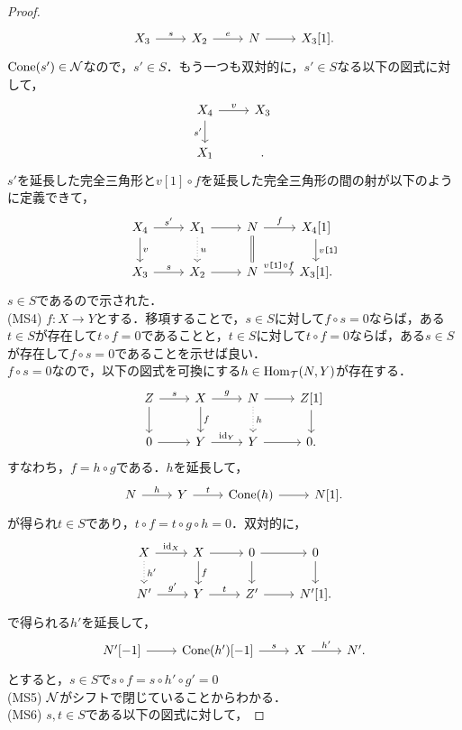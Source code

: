 \begin{proof}
\[\begin{tikzcd}
			X_3 \ar[r,"s",]& X_2\ar[r,"e",]& N \ar[r,"",]& X_3[1].
		\end{tikzcd}
	\]
$\operatorname{\mathrm{Cone}}(s')\in{\mathcal N}$なので，$s'\in S$．もう一つも双対的に，$s'\in S$なる以下の図式に対して，
  \[
  \begin{tikzcd}
		X_4\ar[r,"v"]\ar[d,"s'",swap]& X_3\\
  X_1  & .
  \end{tikzcd}
  \]
	$s'$を延長した完全三角形と$v[1]\circ f$を延長した完全三角形の間の射が以下のように定義できて，
			\[
		\begin{tikzcd}
			X_4 \ar[r,"s'",]\ar[d,"v"]& X_1\ar[r,"",]\ar[d,dotted,"u"]& N\ar[d,equal]\ar[r,"f"]& X_4[1]\ar[d,"v\texttt{[1]}"]\\
			X_3 \ar[r,"s",]& X_2\ar[r,]& N \ar[r,"v\texttt{[1]}\circ f",]& X_3[1].
		\end{tikzcd}
	\]
	$s\in S$であるので示された．\\
	(MS4) $f\colon X\to Y$とする．移項することで，$s\in S$に対して$f\circ s =0$ならば，ある$t\in S$が存在して$t\circ f = 0$であることと，$t\in S$に対して$t\circ f = 0$ならば，ある$s\in S$が存在して$f\circ s =0$であることを示せば良い．\\
	$f\circ s=0$なので，以下の図式を可換にする$h\in\operatorname{\mathrm{Hom}}_{{\mathcal T}}(N,Y)$が存在する．
			\[
		\begin{tikzcd}
			Z \ar[r,"s",]\ar[d]& X\ar[r,"g"]\ar[d,"f"]& N\ar[r,]\ar[d,dotted,"h"]& Z[1]\ar[d]\\
			0\ar[r]&Y\ar[r,"\id_Y"]&Y\ar[r]&0.
		\end{tikzcd}
	\]
	すなわち，$f=h\circ g$である．$h$を延長して，
			\[
		\begin{tikzcd}
			N \ar[r,"h",]& Y\ar[r,"t"]& \Cone(h)\ar[r,]& N[1].
		\end{tikzcd}
	\]
	が得られ$t\in S$であり，$t\circ f =  t\circ g \circ h = 0$．双対的に，
			\[
		\begin{tikzcd}
			X \ar[r,"\id_X",]\ar[d,dotted,"h'"]& X\ar[r,"",]\ar[d,"f"]& 0\ar[d,]\ar[r,]& 0\ar[d,]\\
			N'\ar[r,"g'"]& Y\ar[r,"t"]& Z' \ar[r,]& N'[1].
		\end{tikzcd}
	\]
	で得られる$h'$を延長して，
			\[
		\begin{tikzcd}
			N'[-1] \ar[r,]& \Cone(h')[-1]\ar[r,"s"]&X \ar[r,"h'"]& N'.
		\end{tikzcd}
	\]
	とすると，$s\in S$で$s\circ f = s\circ h'\circ g' = 0$ \\
	(MS5) ${\mathcal N}$がシフトで閉じていることからわかる．\\
	(MS6)
	$s,t\in S$である以下の図式に対して，

\end{proof}
